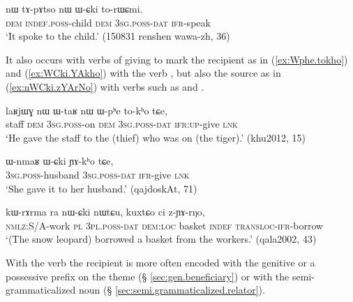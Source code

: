 \begin{exe}
\ex \label{ex:WCki.torWCmi}
\gll nɯ tɤ-pɤtso nɯ ɯ-ɕki to-rɯɕmi. \\
\textsc{dem} \textsc{indef}.\textsc{poss}-child \textsc{dem} \textsc{3sg}.\textsc{poss}-\textsc{dat} \textsc{ifr}-speak \\
\glt  `It spoke to the child.' (150831 renshen wawa-zh, 36)
\end{exe}

It also occurs with verbs of giving to mark the recipient as in (\ref{ex:Wphe.tokho}) and (\ref{ex:WCki.YAkho}) with the verb , but also the source as in (\ref{ex:nWCki.zYArNo}) with verbs such as  and .

\begin{exe}
\ex \label{ex:Wphe.tokho}
\gll laʁjɯɣ nɯ ɯ-taʁ nɯ ɯ-pʰe to-kʰo tɕe,  \\
staff \textsc{dem} \textsc{3sg}.\textsc{poss}-on \textsc{dem} \textsc{3sg}.\textsc{poss}-\textsc{dat} \textsc{ifr}:\textsc{up}-give \textsc{lnk} \\
\glt `He gave the staff to the (thief) who was on (the tiger).' (khu2012, 15)
\end{exe}

\begin{exe}
\ex \label{ex:WCki.YAkho}
\gll  ɯ-nmaʁ ɯ-ɕki ɲɤ-kʰo tɕe,  \\
\textsc{3sg}.\textsc{poss}-husband \textsc{3sg}.\textsc{poss}-\textsc{dat} \textsc{ifr}-give \textsc{lnk} \\
\glt `She gave it to her husband.' (qajdoskAt, 71)
\end{exe}

\begin{exe}
\ex \label{ex:nWCki.zYArNo}
\gll 
kɯ-rɤrma ra nɯ-ɕki nɯtɕu, kuxtɕo ci z-ɲɤ-rŋo, \\
\textsc{nmlz}:S/A-work \textsc{pl} \textsc{3pl}.\textsc{poss}-\textsc{dat} \textsc{dem}:\textsc{loc} basket \textsc{indef} \textsc{transloc}-\textsc{ifr}-borrow \\
\glt `(The snow leopard) borrowed a basket from the workers.' (qala2002, 43)
\end{exe}

With the verb  the recipient is more often encoded with the genitive or a possessive prefix on the theme (§ \ref{sec:gen.beneficiary}) or with the semi-grammaticalized noun  (§ \ref{sec:semi.grammaticalized.relator}).


